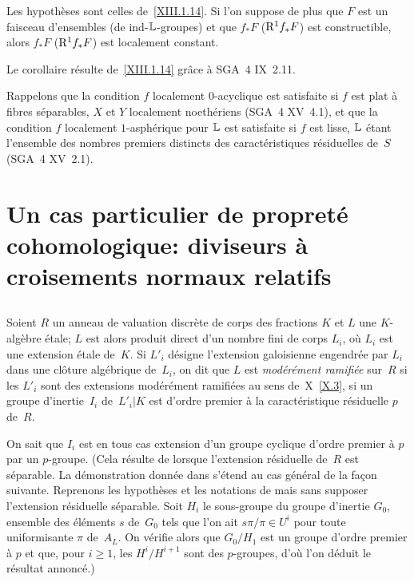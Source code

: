 \begin{corollaire}
\label{XIII.1.16}
Les hypoth\`eses sont celles de~\ref{XIII.1.14}. Si l'on suppose de
plus que $F$ est un faisceau d'ensembles (\resp de ind-$\mathbb{L}$-groupes)
et que $f_* F$ (\resp $\mathrm{R}^1 f_* F$) est constructible, alors
$f_* F$ (\resp $\mathrm{R}^1 f_* F$) est localement constant.
\end{corollaire}

Le corollaire r\'esulte de~\ref{XIII.1.14} gr\^ace \`a SGA~4
IX~2.11.

\begin{remarque}
\label{XIII.1.17}
Rappelons que la condition $f$ localement $0$-acyclique est satisfaite
si $f$ est plat \`a fibres s\'eparables, $X$ et $Y$ localement
noeth\'eriens (SGA~4 XV~4.1), et que la condition $f$ localement
$1$-asph\'erique
pour $\mathbb{L}$ est satisfaite si $f$ est lisse, $\mathbb{L}$ \'etant l'ensemble
des nombres premiers distincts des caract\'eristiques
r\'esiduelles de~$S$ (SGA~4 XV~2.1).
\end{remarque}

\section[Un cas particulier de propret\'e cohomologique]{Un cas particulier de propret\'e cohomologique: diviseurs
\`a croisements normaux relatifs}
\label{XIII.2}

\setcounter{subsection}{-1}

\subsection{}
\label{XIII.2.0}
Soient $R$ un anneau de valuation discr\`ete de corps des fractions
$K$ et $L$ une $K$-alg\`ebre \'etale; $L$ est alors produit direct
d'un nombre fini de corps $L_i$, o\`u $L_i$ est une extension
\'etale de~$K$. Si $L'_i$ d\'esigne l'extension galoisienne
engendr\'ee par $L_i$ dans une cl\^oture alg\'ebrique de~$L_i$,
on dit que $L$ est \emph{modérément ramifiée}
sur~$R$ si les $L'_i$ sont des extensions mod\'er\'ement
ramifi\'ees au sens de~X~\ref{X.3}, \ie si un groupe d'inertie~$I_i$ de~$L'_i|K$ est d'ordre premier \`a la caract\'eristique
r\'esiduelle $p$ de~$R$.

On sait que $I_i$ est en tous cas extension d'un groupe cyclique
d'ordre premier \`a $p$ par un $p$-groupe. (Cela r\'esulte de \cite[ch.\, IV prop.\, 7 cor.\, 4]{XIII.5} lorsque l'extension r\'esiduelle de~$R$ est
s\'eparable. La d\'emonstration donn\'ee dans
\loccit s'\'etend au cas g\'en\'eral de la fa\c con
suivante. Reprenons les hypoth\`eses et les notations de
\loccit mais sans supposer l'extension r\'esiduelle
s\'eparable. Soit $H_i$ le sous-groupe du groupe d'inertie $G_0$,
ensemble des \'el\'ements $s$ de~$G_0$ tels que l'on ait $s \pi /
\pi \in U^i$ pour toute uniformisante $\pi$ de~$A_L$. On v\'erifie
alors que $G_0/H_1$ est un groupe d'ordre premier \`a $p$ et que,
pour $i \geqslant 1$, les $H^i/H^{i+1}$ sont des $p$-groupes, d'o\`u
l'on d\'eduit le r\'esultat annonc\'e.)

